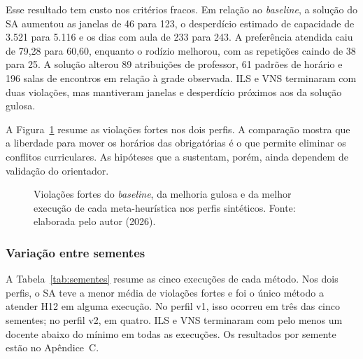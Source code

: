 Esse resultado tem custo nos critérios fracos. Em relação ao \textit{baseline}, a solução do SA aumentou as janelas de 46 para 123, o desperdício estimado de capacidade de 3.521 para 5.116 e os dias com aula de 233 para 243. A preferência atendida caiu de 79,28 para 60,60, enquanto o rodízio melhorou, com as repetições caindo de 38 para 25. A solução alterou 89 atribuições de professor, 61 padrões de horário e 196 salas de encontros em relação à grade observada. ILS e VNS terminaram com duas violações, mas mantiveram janelas e desperdício próximos aos da solução gulosa.

A Figura~\ref{fig:hard} resume as violações fortes nos dois perfis. A comparação mostra que a liberdade para mover os horários das obrigatórias é o que permite eliminar os conflitos curriculares. As hipóteses que a sustentam, porém, ainda dependem de validação do orientador.

\begin{figure}[htbp]
  \centering
  \caption{Violações fortes do \textit{baseline}, da melhoria gulosa e da melhor execução de cada meta-heurística nos perfis sintéticos. Fonte: elaborada pelo autor (2026).}
  \label{fig:hard}
\end{figure}

\subsubsection{Variação entre sementes}

A Tabela~\ref{tab:sementes} resume as cinco execuções de cada método. Nos dois perfis, o SA teve a menor média de violações fortes e foi o único método a atender H12 em alguma execução. No perfil v1, isso ocorreu em três das cinco sementes; no perfil v2, em quatro. ILS e VNS terminaram com pelo menos um docente abaixo do mínimo em todas as execuções. Os resultados por semente estão no Apêndice~C.

